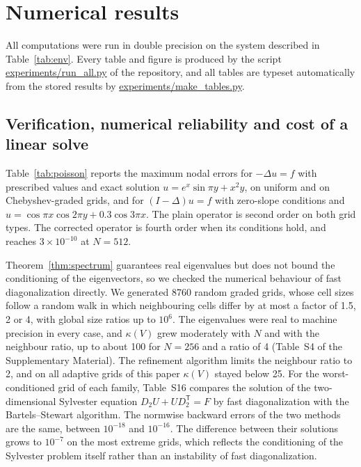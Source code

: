\documentclass[preprint,12pt]{elsarticle}
\theoremstyle{remark}
\begin{document}
\section{Numerical results}\label{sec:results}
All computations were run in double precision on the system described in Table~\ref{tab:env}. Every table and figure is produced by the script \url{experiments/run_all.py} of the
repository, and all tables are typeset automatically from the stored results by
\url{experiments/make_tables.py}.

\begin{table}[t]\centering\small
\caption{Computing environment and timing protocol.}\label{tab:env}

\end{table}

\subsection{Verification, numerical reliability and cost of a linear solve}\label{sec:spectrumstudy}
Table~\ref{tab:poisson} reports the maximum nodal errors for $-\Delta u=f$ with prescribed values and
exact solution $u=e^x\sin\pi y+x^2y$, on uniform and on Chebyshev-graded grids, and for $(I-\Delta)u=f$
with zero-slope conditions and $u=\cos\pi x\cos2\pi y+0.3\cos3\pi x$. The plain operator is second order
on both grid types. The corrected operator is fourth order when its conditions hold, and reaches
$3\times10^{-10}$ at $N=512$.

\begin{table}[t]\centering\small
\caption{Maximum nodal error and observed convergence rates for two model problems.}\label{tab:poisson}

\end{table}

Theorem~\ref{thm:spectrum} guarantees real eigenvalues but does not bound the conditioning of the
eigenvectors, so we checked the numerical behaviour of fast diagonalization directly. We generated 8760
random graded grids, whose cell sizes follow a random walk in which neighbouring cells differ by at most
a factor of 1.5, 2 or 4, with global size ratios up to $10^6$. The eigenvalues were real to machine
precision in every case, and $\kappa(V)$ grew moderately with $N$ and with the neighbour ratio, up to
about 100 for $N=256$ and a ratio of 4 (Table~S4 of the Supplementary Material). The refinement algorithm
limits the neighbour ratio to 2, and on all adaptive grids of this paper $\kappa(V)$ stayed below 25. For
the worst-conditioned grid of each family, Table~S16 compares the solution of the
two-dimensional Sylvester equation $D_2U+UD_2^{\mathsf T}=F$ by fast diagonalization with the
Bartels--Stewart algorithm. The normwise backward errors of the two methods are the same, between
$10^{-18}$ and $10^{-16}$. The difference between their solutions grows to $10^{-7}$ on the most extreme
grids, which reflects the conditioning of the Sylvester problem itself rather than an instability of fast diagonalization.
\end{document}
